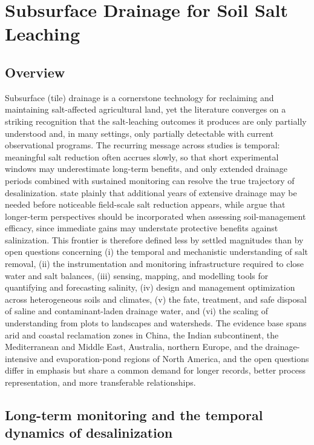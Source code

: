 \documentclass[11pt]{article}
\begin{document}
\section*{Subsurface Drainage for Soil Salt Leaching}

\subsection{Overview}

Subsurface (tile) drainage is a cornerstone technology for reclaiming and maintaining salt-affected agricultural land, yet the literature converges on a striking recognition that the salt-leaching outcomes it produces are only partially understood and, in many settings, only partially detectable with current observational programs. The recurring message across studies is temporal: meaningful salt reduction often accrues slowly, so that short experimental windows may underestimate long-term benefits, and only extended drainage periods combined with sustained monitoring can resolve the true trajectory of desalinization. \textcite{Almen2021} state plainly that additional years of extensive drainage may be needed before noticeable field-scale salt reduction appears, while \textcite{Daigh2025} argue that longer-term perspectives should be incorporated when assessing soil-management efficacy, since immediate gains may understate protective benefits against salinization. This frontier is therefore defined less by settled magnitudes than by open questions concerning (i) the temporal and mechanistic understanding of salt removal, (ii) the instrumentation and monitoring infrastructure required to close water and salt balances, (iii) sensing, mapping, and modelling tools for quantifying and forecasting salinity, (iv) design and management optimization across heterogeneous soils and climates, (v) the fate, treatment, and safe disposal of saline and contaminant-laden drainage water, and (vi) the scaling of understanding from plots to landscapes and watersheds. The evidence base spans arid and coastal reclamation zones in China, the Indian subcontinent, the Mediterranean and Middle East, Australia, northern Europe, and the drainage-intensive and evaporation-pond regions of North America, and the open questions differ in emphasis but share a common demand for longer records, better process representation, and more transferable relationships.

\subsection{Long-term monitoring and the temporal dynamics of desalinization}
\end{document}
